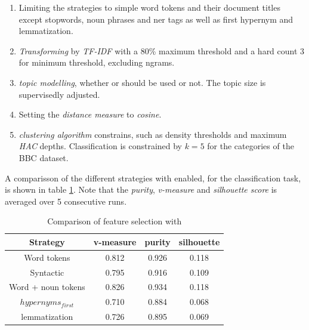   \begin{enumerate}
    \item Limiting the strategies to simple word tokens and their document titles except stopwords, noun phrases and ner tags as well as \wordnet{} first hypernym and \wordnet{}lemmatization.

    \item \emph{Transforming} by \emph{TF-IDF} with a 80\% maximum threshold and a hard count $3$ for minimum threshold, excluding ngrams.

    \item \emph{topic modelling}, whether \lsa{} or \lda{} should be used or not. The topic size is supervisedly adjusted.

    \item Setting the \emph{distance measure} to \emph{cosine}.

    \item \emph{clustering algorithm} constrains, such as density thresholds and maximum \emph{HAC} depths. Classification is constrained by $k=5$ for the categories of the BBC dataset.
  \end{enumerate}

A comparisson of the different strategies with \lsa{} enabled, for the classification task, is shown in table \ref{comparison_single_with_lsa}. Note that the \emph{purity}, \emph{v-measure} and \emph{silhouette score} is averaged over 5 consecutive runs.

  \begin{table}\label{comparison_single_with_lsa}
    \begin{tabular}{ c | c | c | c }
      Strategy    & v-measure & purity  & silhouette \\ \hline
      Word tokens & 0.812     & 0.926   & 0.118      \\
      Syntactic   & 0.795     & 0.916     & 0.109 \\
      Word + noun tokens & 0.826   & 0.934     & 0.118 \\
      \wordnet{} $hypernyms_{first}$ & 0.710   & 0.884     & 0.068 \\
      \wordnet{} lemmatization   & 0.726   & 0.895     & 0.069 \\
    \end{tabular}
    \caption{Comparison of feature selection with \lsa{}}
  \end{table}

